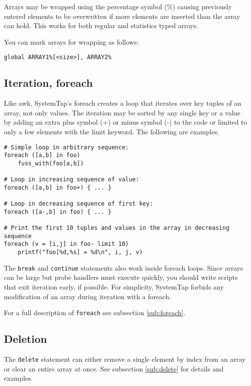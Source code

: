 \documentclass[twoside,english]{article}
\newenvironment{vindent}
{\begin{list}{}{\setlength{\listparindent}{6pt}}
\item[]}
{\end{list}}
\begin{document}
Arrays may be wrapped using the percentage symbol (\%) causing previously entered
elements to be overwritten if more elements are inserted than the array can
hold. This works for both regular and statistics typed arrays.

You can mark arrays for wrapping as follows:

\begin{vindent}
\begin{verbatim}
global ARRAY1%[<size>], ARRAY2%
\end{verbatim}
\end{vindent}

\subsection{Iteration, foreach}
Like awk, SystemTap's foreach creates a loop that iterates over key tuples
of an array, not only values. The iteration may be sorted by any single key
or a value by adding an extra plus symbol (+) or minus symbol (-) to the
code or limited to only a few elements with the limit keyword.
The following are examples.

\begin{vindent}
\begin{verbatim}
# Simple loop in arbitrary sequence:
foreach ([a,b] in foo)
    fuss_with(foo[a,b])

# Loop in increasing sequence of value:
foreach ([a,b] in foo+) { ... }

# Loop in decreasing sequence of first key:
foreach ([a-,b] in foo) { ... }

# Print the first 10 tuples and values in the array in decreasing sequence
foreach (v = [i,j] in foo- limit 10)
    printf("foo[%d,%s] = %d\n", i, j, v)
\end{verbatim}
\end{vindent}
The \texttt{break} and \texttt{continue} statements also work inside foreach
loops. Since arrays can be large but probe handlers must execute quickly,
you should write scripts that exit iteration early, if possible. For simplicity,
SystemTap forbids any modification of an array during iteration with a foreach.

For a full description of \texttt{foreach} see subsection \ref{sub:foreach}.

\subsection{Deletion}
The \texttt{delete} statement can either remove a single element by index from
an array or clear an entire array at once.  See subsection \ref{sub:delete} for
details and examples.
\end{document}

